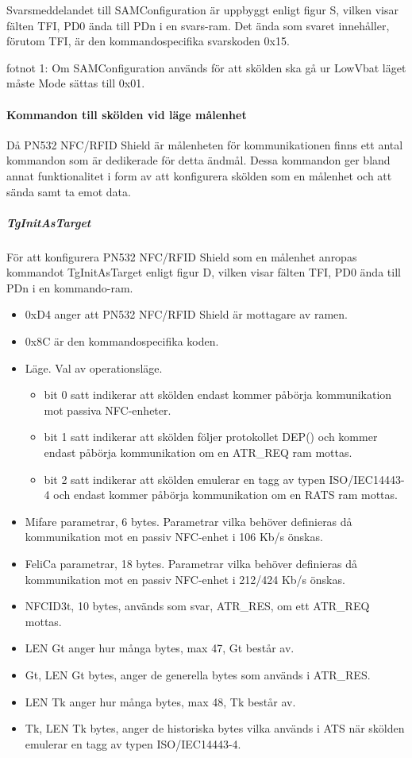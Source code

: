 \documentclass[11pt]{article}
\begin{document}
Svarsmeddelandet till SAMConfiguration är uppbyggt enligt figur S, vilken visar fälten TFI, PD0 ända till PDn i en svars-ram. Det ända som svaret innehåller, förutom TFI,  är den kommandospecifika svarskoden 0x15.


fotnot 1: Om SAMConfiguration används för att skölden ska gå ur LowVbat läget måste Mode sättas till 0x01.  

\paragraph{Kommandon till skölden vid läge målenhet}
Då PN532 NFC/RFID Shield är målenheten för kommunikationen finns ett antal kommandon som är dedikerade för detta ändmål. Dessa kommandon ger bland annat funktionalitet i form av att konfigurera skölden som en målenhet och att sända samt ta emot data.

\subparagraph{TgInitAsTarget}
För att konfigurera PN532 NFC/RFID Shield som en målenhet anropas kommandot TgInitAsTarget enligt figur D, vilken visar fälten TFI, PD0 ända till PDn i en kommando-ram. 


\begin{itemize}
\item 0xD4 anger att PN532 NFC/RFID Shield är mottagare av ramen.
\item 0x8C är den kommandospecifika koden.
\item Läge. Val av operationsläge. 
\begin{itemize}
\item bit 0 satt indikerar att skölden endast kommer påbörja kommunikation mot passiva NFC-enheter.
\item bit 1 satt indikerar att skölden följer protokollet DEP() och kommer endast påbörja kommunikation om en ATR\_REQ ram mottas.
\item bit 2 satt indikerar att skölden emulerar en tagg av typen ISO/IEC14443-4 och endast kommer påbörja kommunikation om en RATS ram mottas.
\end{itemize}
\item Mifare parametrar, 6 bytes. Parametrar vilka behöver definieras då kommunikation mot en passiv NFC-enhet i 106 Kb/s önskas.
\item FeliCa parametrar, 18 bytes. Parametrar vilka behöver definieras då kommunikation mot en passiv NFC-enhet i 212/424 Kb/s önskas.
\item NFCID3t, 10 bytes, används som svar, ATR\_RES, om ett ATR\_REQ mottas.
\item LEN Gt anger hur många bytes, max 47, Gt består av. 
\item Gt, LEN Gt bytes, anger de generella bytes som används i ATR\_RES.
\item LEN Tk anger hur många bytes, max 48, Tk består av.
\item Tk, LEN Tk bytes, anger de historiska bytes vilka används i ATS när skölden emulerar en tagg av typen ISO/IEC14443-4.
\end{itemize}
\end{document}
